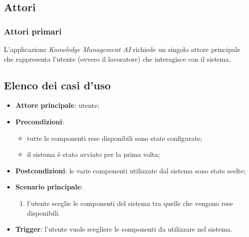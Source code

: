 \documentclass[10pt, a4paper]{article}
\begin{document}
\subsection{Attori}
\subsubsection{Attori primari}
L'applicazione \textit{Knowledge Management AI} richiede un singolo attore principale che rappresenta l'utente (ovvero il lavoratore) che interagisce con il sistema.
\newpage
\subsection{Elenco dei casi d'uso}

    \begin{itemize}
        \item \textbf{Attore principale}: utente;
        \item \textbf{Precondizioni}: 
        \begin{itemize}
            \item tutte le componenti rese disponibili sono state configurate;
            \item il sistema è stato avviato per la prima volta;
        \end{itemize}
        \item \textbf{Postcondizioni}: le varie componenti utilizzate dal sistema sono state scelte;
        \item \textbf{Scenario principale}:
            \begin{enumerate}
                \item l'utente sceglie le componenti del sistema tra quelle che vengono rese disponibili.
            \end{enumerate}
        \item \textbf{Trigger}: l’utente vuole scegliere le componenti da utilizzare nel sistema.
    \end{itemize}

    

    
\end{document}

